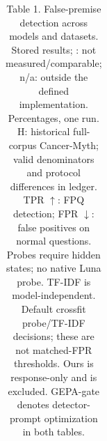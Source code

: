 \begin{table}[t]
{\begin{tabular}{lcccccccccccccccccccc}
\bottomrule
\end{tabular}}
\caption{Table 1. False-premise detection across models and datasets. Stored results; \textemdash: not measured/comparable; n/a: outside the defined implementation. Percentages, one run. H: historical full-corpus Cancer-Myth; valid denominators and protocol differences in ledger. TPR $\uparrow$: FPQ detection; FPR $\downarrow$: false positives on normal questions. Probes require hidden states; no native Luna probe. TF-IDF is model-independent. Default crossfit probe/TF-IDF decisions; these are not matched-FPR thresholds. Ours is response-only and is excluded. GEPA-gate denotes detector-prompt optimization in both tables.}
\label{tab:table1}
\end{table}
